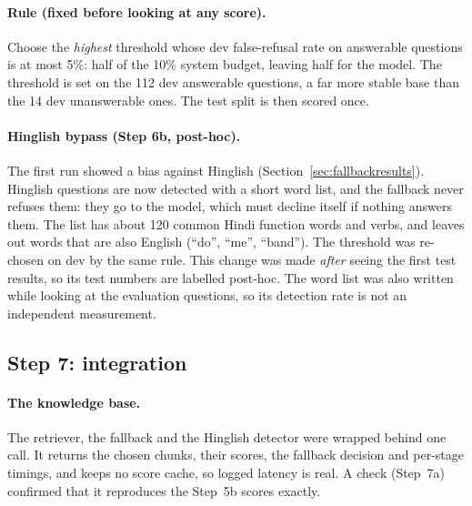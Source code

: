 \documentclass[11pt,a4paper]{article}
\begin{document}
\paragraph{Rule (fixed before looking at any score).} Choose the \emph{highest} threshold whose dev false-refusal rate
on answerable questions is at most 5\%: half of the 10\% system budget, leaving half for the model. The threshold is set
on the 112 dev answerable questions, a far more stable base than the 14 dev unanswerable ones. The test split is then
scored once.

\paragraph{Hinglish bypass (Step 6b, post-hoc).} The first run showed a bias against Hinglish
(Section~\ref{sec:fallbackresults}). Hinglish questions are now detected with a short word list, and the fallback never
refuses them: they go to the model, which must decline itself if nothing answers them. The list has about 120 common
Hindi function words and verbs, and leaves out words that are also English (``do'', ``me'', ``band''). The threshold
was re-chosen on dev by the same rule. This change was made \emph{after} seeing the first test results, so its test
numbers are labelled post-hoc. The word list was also written while looking at the evaluation questions, so its
detection rate is not an independent measurement.

\subsection{Step 7: integration}\label{sec:integration}
\paragraph{The knowledge base.} The retriever, the fallback and the Hinglish detector were wrapped behind one call. It
returns the chosen chunks, their scores, the fallback decision and per-stage timings, and keeps no score cache, so
logged latency is real. A check (Step~7a) confirmed that it reproduces the Step~5b scores exactly.
\end{document}
